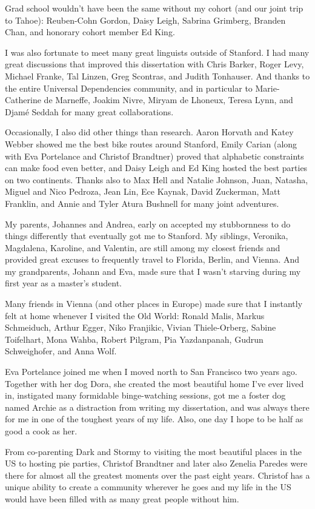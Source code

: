 Grad school wouldn't have been the same without my cohort (and our joint trip to Tahoe): Reuben-Cohn Gordon, Daisy Leigh, Sabrina Grimberg, Branden Chan, and honorary cohort member Ed King.

I was also fortunate to meet many great linguists outside of Stanford. I had many great discussions that improved this dissertation with Chris Barker, Roger Levy, Michael Franke, Tal Linzen, Greg Scontras, and Judith Tonhauser. And thanks to the entire Universal Dependencies community, and in particular to Marie-Catherine de Marneffe, Joakim Nivre, Miryam de Lhoneux, Teresa Lynn, and Djam\'e Seddah for many great collaborations.

Occasionally, I also did other things than research. Aaron Horvath and Katey Webber showed me the best bike routes around Stanford, Emily Carian (along with Eva Portelance and Christof Brandtner) proved that alphabetic constraints can make food even better, and Daisy Leigh and Ed King hosted the best parties on two continents. Thanks also to Max Hell and Natalie Johnson, Juan, Natasha, Miguel and Nico Pedroza, Jean Lin, Ece Kaynak, David Zuckerman, Matt Franklin, and Annie and Tyler Atura Bushnell for many joint adventures.

My parents, Johannes and Andrea, early on accepted my stubbornness to do things differently that eventually got me to Stanford. My siblings, Veronika, Magdalena, Karoline, and Valentin, are still among my closest friends and provided great excuses to frequently travel to Florida, Berlin, and Vienna. And my grandparents, Johann and Eva, made sure that I wasn't starving during my first year as a master's student.

Many friends in Vienna (and other places in Europe) made sure that I instantly felt at home whenever I visited the Old World: Ronald Malis, Markus Schmeiduch, Arthur Egger, Niko Franjikic, Vivian Thiele-Orberg, Sabine Toifelhart, Mona Wahba, Robert Pilgram, Pia Yazdanpanah, Gudrun Schweighofer, and Anna Wolf.

Eva Portelance joined me when I moved north to San Francisco two years ago. Together with her dog Dora, she created the most beautiful home I've ever lived in, instigated many formidable binge-watching sessions, got me a foster dog named Archie as a distraction from writing my dissertation, and was always there for me in one of the toughest years of my life.  Also, one day I hope to be half as good a cook as her.

From co-parenting Dark and Stormy to visiting the most beautiful places in the US to hosting pie parties, Christof Brandtner and later also Zenelia Paredes were there for almost all the greatest moments over the past eight years. Christof has a unique ability to create a community wherever he goes and my life in the US would have been filled with as many great people without him.

